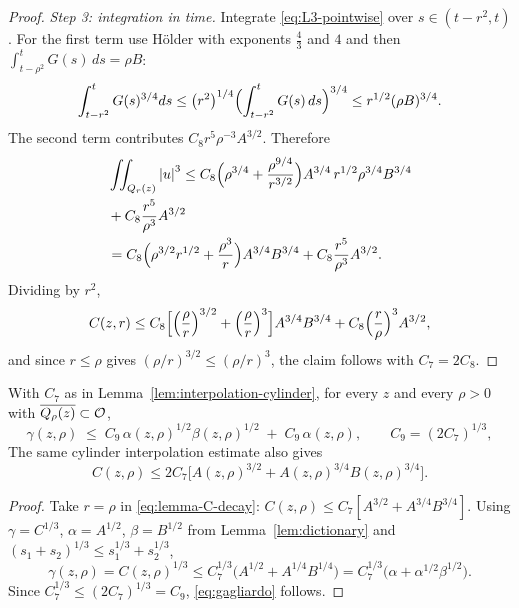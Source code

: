 \documentclass[11pt,reqno]{amsart}
\begin{document}
\begin{proof}
\emph{Step 3: integration in time.} Integrate \eqref{eq:L3-pointwise} over
$s\in(t-r^{2},t)$. For the first term use H\"older with exponents
$\tfrac43$ and $4$ and then $\int_{t-\rho^{2}}^{t}G(s)\,ds=\rho B$:
\[
  \int_{t-r^{2}}^{t}G(s)^{3/4}ds
  \le\bigl(r^{2}\bigr)^{1/4}\Bigl(\int_{t-r^{2}}^{t}G(s)\,ds\Bigr)^{3/4}
  \le r^{1/2}(\rho B)^{3/4} .
\]
The second term contributes $C_{8}r^{5}\rho^{-3}A^{3/2}$. Therefore
\[\begin{aligned}
  &\iint_{Q_{r}(z)}\left\lvert u \right\rvert^{3}
  \le C_{8}\Bigl(\rho^{3/4}+\frac{\rho^{9/4}}{r^{3/2}}\Bigr)
       A^{3/4}\,r^{1/2}\rho^{3/4}B^{3/4}
  \\ &+C_{8}\frac{r^{5}}{\rho^{3}}A^{3/2}
  \\ &= C_{8}\Bigl(\rho^{3/2}r^{1/2}+\frac{\rho^{3}}{r}\Bigr)A^{3/4}B^{3/4}
    +C_{8}\frac{r^{5}}{\rho^{3}}A^{3/2}.
\end{aligned}\]
Dividing by $r^{2}$,
\[
  C(z,r)\le C_{8}\Bigl[\Bigl(\frac\rho r\Bigr)^{3/2}
     +\Bigl(\frac\rho r\Bigr)^{3}\Bigr]A^{3/4}B^{3/4}
    +C_{8}\Bigl(\frac r\rho\Bigr)^{3}A^{3/2},
\]
and since $r\le\rho$ gives $(\rho/r)^{3/2}\le(\rho/r)^{3}$, the claim follows
with $C_{7}=2C_{8}$.
\end{proof}

\begin{corollary}\label{cor:gagliardo}
With $C_{7}$ as in Lemma~\ref{lem:interpolation-cylinder}, for every $z$ and
every $\rho>0$ with $\overline{Q_{\rho}(z)}\subset\mathcal{O}$,
\begin{equation}\label{eq:gagliardo}
  \gamma(z,\rho)\;\le\;C_{9}\,\alpha(z,\rho)^{1/2}\beta(z,\rho)^{1/2}
    \;+\;C_{9}\,\alpha(z,\rho),
  \qquad C_{9}=(2C_{7})^{1/3},
\end{equation}
The same cylinder interpolation estimate also gives
\[
C(z,\rho)\le 2C_{7}\bigl[A(z,\rho)^{3/2}+A(z,\rho)^{3/4}B(z,\rho)^{3/4}\bigr]
.
\]
\end{corollary}

\begin{proof}
Take $r=\rho$ in \eqref{eq:lemma-C-decay}:
$C(z,\rho)\le C_{7}[A^{3/2}+A^{3/4}B^{3/4}]$. Using
$\gamma=C^{1/3}$, $\alpha=A^{1/2}$, $\beta=B^{1/2}$ from
Lemma~\ref{lem:dictionary} and
$(s_{1}+s_{2})^{1/3}\le s_{1}^{1/3}+s_{2}^{1/3}$,
\[
  \gamma(z,\rho)=C(z,\rho)^{1/3}
  \le C_{7}^{1/3}\bigl(A^{1/2}+A^{1/4}B^{1/4}\bigr)
  = C_{7}^{1/3}\bigl(\alpha+\alpha^{1/2}\beta^{1/2}\bigr).
\]
Since $C_{7}^{1/3}\le(2C_{7})^{1/3}=C_{9}$, \eqref{eq:gagliardo} follows.
\end{proof}
\end{document}
